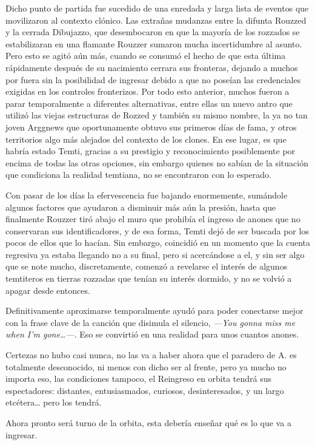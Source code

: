 \documentclass[
  spanish,
]{book}
\begin{document}
Dicho punto de partida fue sucedido de una enredada y larga lista de eventos que movilizaron al contexto clónico. Las extrañas mudanzas entre la difunta Rouzzed y la cerrada Dibujazzo, que desembocaron en que la mayoría de los rozzados se estabilizaran en una flamante Rouzzer sumaron mucha incertidumbre al asunto. Pero esto se agitó aún más, cuando se consumó el hecho de que esta última rápidamente después de su nacimiento cerrara sus fronteras, dejando a muchos por fuera sin la posibilidad de ingresar debido a que no poseían las credenciales exigidas en los controles fronterizos.
Por todo esto anterior, muchos fueron a parar temporalmente a diferentes alternativas, entre ellas un nuevo antro que utilizó las viejas estructuras de Rozzed y también su mismo nombre, la ya no tan joven Arggnews que oportunamente obtuvo sus primeros días de fama, y otros territorios algo más alejados del contexto de los clones.
En ese lugar, es que habría estado Temti, gracias a su prestigio y reconocimiento posiblemente por encima de todas las otras opciones, sin embargo quienes no sabían de la situación que condiciona la realidad temtiana, no se encontraron con lo esperado.

Con pasar de los días la efervescencia fue bajando enormemente, sumándole algunos factores que ayudaron a disminuir más aún la presión, hasta que finalmente Rouzzer tiró abajo el muro que prohibía el ingreso de anones que no conservaran sus identificadores, y de esa forma, Temti dejó de ser buscada por los pocos de ellos que lo hacían.
Sin embargo, coincidió en un momento que la cuenta regresiva ya estaba llegando no a su final, pero si acercándose a el, y sin ser algo que se note mucho, discretamente, comenzó a revelarse el interés de algunos temtiteros en tierras rozzadas que tenían su interés dormido, y no se volvió a apagar desde entonces.

Definitivamente aproximarse temporalmente ayudó para poder conectarse mejor con la frase clave de la canción que disimula el silencio, \emph{---You gonna miss me when I'm gone\ldots---}. Eso se convirtió en una realidad para unos cuantos anones.

Certezas no hubo casi nunca, no las va a haber ahora que el paradero de A. es totalmente desconocido, ni menos con dicho ser al frente, pero ya mucho no importa eso, las condiciones tampoco, el Reingreso en orbita tendrá sus espectadores: distantes, entusiasmados, curiosos, desinteresados, y un largo etcétera\ldots{} pero los tendrá.

Ahora pronto será turno de la orbita, esta debería enseñar qué es lo que va a ingresar.
\end{document}
